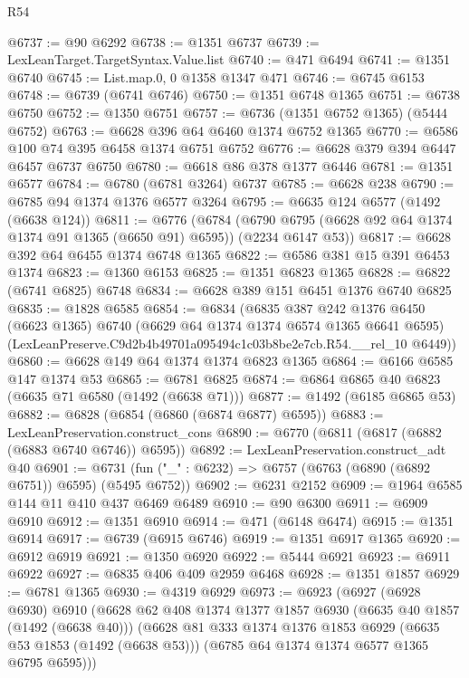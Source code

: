 \begin{lexlean}{R54}
\begin{coremodule}
@6737 := @90 @6292
@6738 := @1351 @6737
@6739 := LexLeanTarget.TargetSyntax.Value.list
@6740 := @471 @6494
@6741 := @1351 @6740
@6745 := List.map.{0, 0} @1358 @1347 @471
@6746 := @6745 @6153
@6748 := @6739 (@6741 @6746)
@6750 := @1351 @6748 @1365
@6751 := @6738 @6750
@6752 := @1350 @6751
@6757 := @6736 (@1351 @6752 @1365) (@5444 @6752)
@6763 := @6628 @396 @64 @6460 @1374 @6752 @1365
@6770 := @6586 @100 @74 @395 @6458 @1374 @6751 @6752
@6776 := @6628 @379 @394 @6447 @6457 @6737 @6750
@6780 := @6618 @86 @378 @1377 @6446
@6781 := @1351 @6577
@6784 := @6780 (@6781 @3264) @6737
@6785 := @6628 @238
@6790 := @6785 @94 @1374 @1376 @6577 @3264
@6795 := @6635 @124 @6577 (@1492 (@6638 @124))
@6811 := @6776
    (@6784 (@6790 @6795 (@6628 @92 @64 @1374 @1374 @91 @1365 (@6650 @91) @6595)) (@2234 @6147 @53))
@6817 := @6628 @392 @64 @6455 @1374 @6748 @1365
@6822 := @6586 @381 @15 @391 @6453 @1374
@6823 := @1360 @6153
@6825 := @1351 @6823 @1365
@6828 := @6822 (@6741 @6825) @6748
@6834 := @6628 @389 @151 @6451 @1376 @6740 @6825
@6835 := @1828 @6585
@6854 := @6834
    (@6835
      @387
      @242
      @1376
      @6450
      (@6623 @1365)
      @6740
      (@6629 @64 @1374 @1374 @6574 @1365 @6641 @6595)
      (LexLeanPreserve.C9d2b4b49701a095494c1c03b8be2e7cb.R54.__rel_10 @6449))
@6860 := @6628 @149 @64 @1374 @1374 @6823 @1365
@6864 := @6166 @6585 @147 @1374 @53
@6865 := @6781 @6825
@6874 := @6864 @6865 @40 @6823 (@6635 @71 @6580 (@1492 (@6638 @71)))
@6877 := @1492 (@6185 @6865 @53)
@6882 := @6828 (@6854 (@6860 (@6874 @6877) @6595))
@6883 := LexLeanPreservation.construct_cons
@6890 := @6770 (@6811 (@6817 (@6882 (@6883 @6740 @6746)) @6595))
@6892 := LexLeanPreservation.construct_adt @40
@6901 := @6731 (fun ("_" : @6232) => @6757 (@6763 (@6890 (@6892 @6751)) @6595) (@5495 @6752))
@6902 := @6231 @2152
@6909 := @1964 @6585 @144 @11 @410 @437 @6469 @6489
@6910 := @90 @6300
@6911 := @6909 @6910
@6912 := @1351 @6910
@6914 := @471 (@6148 @6474)
@6915 := @1351 @6914
@6917 := @6739 (@6915 @6746)
@6919 := @1351 @6917 @1365
@6920 := @6912 @6919
@6921 := @1350 @6920
@6922 := @5444 @6921
@6923 := @6911 @6922
@6927 := @6835 @406 @409 @2959 @6468
@6928 := @1351 @1857
@6929 := @6781 @1365
@6930 := @4319 @6929
@6973 := @6923
    (@6927
      (@6928 @6930)
      @6910
      (@6628
        @62
        @408
        @1374
        @1377
        @1857
        @6930
        (@6635 @40 @1857 (@1492 (@6638 @40)))
        (@6628
          @81
          @333
          @1374
          @1376
          @1853
          @6929
          (@6635 @53 @1853 (@1492 (@6638 @53)))
          (@6785 @64 @1374 @1374 @6577 @1365 @6795 @6595)))

\end{coremodule}
\end{lexlean}
